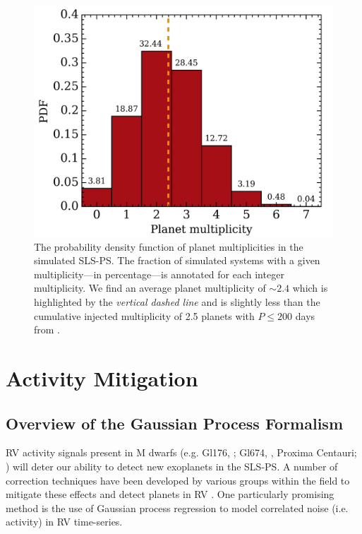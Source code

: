 \begin{figure}
  \centering
  \includegraphics[width=0.6\hsize]{figures/multhist.png}%
  \caption[Histogram of planetary system multiplicities in the simulated SLS-PS.]
      {\small The probability density function of planet multiplicities in the simulated SLS-PS.
    The fraction of simulated systems with a given multiplicity---in percentage---is annotated for
    each integer multiplicity. We find an average planet multiplicity of $\sim 2.4$ which is highlighted by the
    \emph{vertical dashed line} and is slightly less than the cumulative injected multiplicity of 2.5 planets
    with $P\leq 200$ days from \cite{dressing15a}.}
  \label{BSfig:mult}
\end{figure}


\section{Activity Mitigation} \label{BSsect:GP}
\subsection{Overview of the Gaussian Process Formalism}
RV activity signals present in M dwarfs (e.g. Gl176, \citealt{forveille09}; Gl674, \citealt{bonfils07},
Proxima Centauri; \citealt{robertson16}) will deter our ability to detect new exoplanets in the SLS-PS.
A number of correction techniques have been developed by various groups
within the field to mitigate these effects and detect planets in RV \citep[see reviews in][]{fischer16, dumusque17}.
One particularly promising method is the use of Gaussian process regression to model correlated noise (i.e. activity)
in RV time-series. \\

